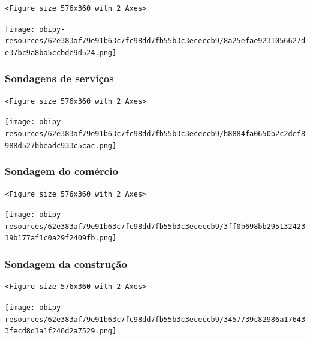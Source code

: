 \documentclass[11pt]{article}
\begin{document}
\begin{verbatim}
<Figure size 576x360 with 2 Axes>
\end{verbatim}


\begin{center}
\texttt{[image: obipy-resources/62e383af79e91b63c7fc98dd7fb55b3c3ececcb9/8a25efae9231056627de37bc9a8ba5ccbde9d524.png]}
\end{center}

\subsubsection{Sondagens de serviços}
\label{sec:org779f45b}

\begin{verbatim}
<Figure size 576x360 with 2 Axes>
\end{verbatim}


\begin{center}
\texttt{[image: obipy-resources/62e383af79e91b63c7fc98dd7fb55b3c3ececcb9/b8884fa0650b2c2def8988d527bbeadc933c5cac.png]}
\end{center}


\subsubsection{Sondagem do comércio}
\label{sec:org258e7b7}

\begin{verbatim}
<Figure size 576x360 with 2 Axes>
\end{verbatim}


\begin{center}
\texttt{[image: obipy-resources/62e383af79e91b63c7fc98dd7fb55b3c3ececcb9/3ff0b698bb29513242319b177af1c0a29f2409fb.png]}
\end{center}

\subsubsection{Sondagem da construção}
\label{sec:orgf74bcb7}

\begin{verbatim}
<Figure size 576x360 with 2 Axes>
\end{verbatim}


\begin{center}
\texttt{[image: obipy-resources/62e383af79e91b63c7fc98dd7fb55b3c3ececcb9/3457739c82986a176433fecd8d1a1f246d2a7529.png]}
\end{center}
\end{document}
